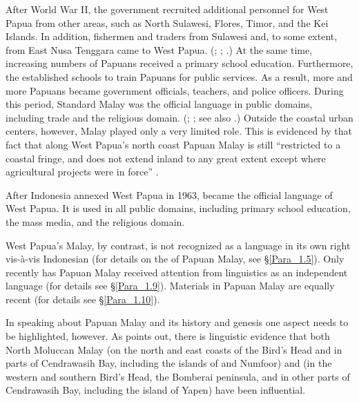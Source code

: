 {After World War II, the  government recruited additional personnel for West Papua from other areas, such as North Sulawesi, Flores, Timor, and the Kei Islands. In addition, fishermen and traders from Sulawesi and, to some extent, from East Nusa Tenggara came to West Papua. (\citealt[96]{Roosman.1982}; \citealt[682]{Adelaar.1996}; \citealt[254--255]{Donohue.2007d}.) At the same time, increasing numbers of Papuans received a primary school education. Furthermore, the  established schools to train Papuans for public services. As a result, more and more Papuans became government officials, teachers, and police officers. During this period, Standard Malay was the official language in public domains, including trade and the religious domain. (\citealt[120]{Chauvel.2002}; \citealt[255]{Donohue.2007d}; see also \citealt[234]{Adelaar.2001}.) Outside the coastal urban centers, however, Malay played only a very limited role. This is evidenced by that fact that along West Papua’s north coast Papuan Malay is still  ``restricted to a coastal fringe, and does not extend inland to any great extent except where agricultural projects were in force'' \citep[255]{Donohue.2007d}.



After Indonesia annexed West Papua in 1963,  became the official language of West Papua. It is used in all public domains, including primary school education, the mass media, and the religious domain.



West Papua’s Malay, by contrast, is not recognized as a language in its own right vis-à-vis Indonesian (for details on the  of Papuan Malay, see §\ref{Para_1.5}). Only recently has Papuan Malay received attention from linguistics as an independent language (for details see §\ref{Para_1.9}). Materials in Papuan Malay are equally recent (for details see §\ref{Para_1.10}).



In speaking about Papuan Malay and its history and genesis one aspect needs to be highlighted, however. As \citet[73]{Paauw.2009} points out, there is linguistic evidence that both North Moluccan Malay (on the north and east coasts of the Bird’s Head and in parts of Cendrawasih Bay, including the islands of  and Numfoor) and  (in the western and southern Bird’s Head, the Bomberai peninsula, and in other parts of Cendrawasih Bay, including the island of Yapen) have been influential.



}
